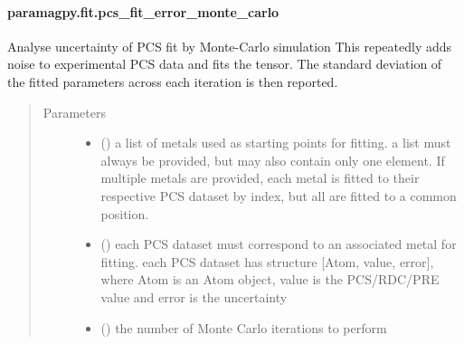 \documentclass[a4paper,10pt,english]{sphinxmanual}
\begin{document}
\paragraph{paramagpy.fit.pcs\_fit\_error\_monte\_carlo}
\label{\detokenize{reference/generated/paramagpy.fit.pcs_fit_error_monte_carlo:paramagpy-fit-pcs-fit-error-monte-carlo}}\label{\detokenize{reference/generated/paramagpy.fit.pcs_fit_error_monte_carlo::doc}}

\begin{fulllineitems}
\label{\detokenize{reference/generated/paramagpy.fit.pcs_fit_error_monte_carlo:paramagpy.fit.pcs_fit_error_monte_carlo}}
Analyse uncertainty of PCS fit by Monte-Carlo simulation
This repeatedly adds noise to experimental PCS data and fits the tensor.
The standard deviation of the fitted parameters across each iteration
is then reported.
\begin{quote}\begin{description}
\item[{Parameters}] \leavevmode\begin{itemize}
\item {} 
 () \textendash{} a list of metals used as starting points for fitting.
a list must always be provided, but may also contain
only one element. If multiple metals are provided, each metal
is fitted to their respective PCS dataset by index, but all are
fitted to a common position.

\item {} 
 () \textendash{} each PCS dataset must correspond to an associated metal for fitting.
each PCS dataset has structure {[}Atom, value, error{]}, where Atom is
an Atom object, value is the PCS/RDC/PRE value
and error is the uncertainty

\item {} 
 () \textendash{} the number of Monte Carlo iterations to perform


\end{itemize}
\end{description}
\end{quote}
\end{fulllineitems}
\end{document}
